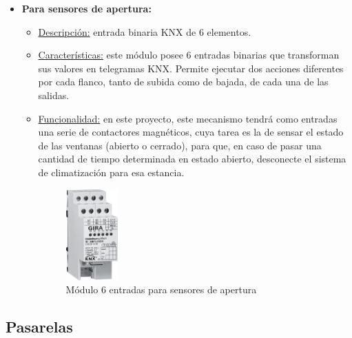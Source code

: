 \begin{itemize}
\item \textbf{Para sensores de apertura:} 
	\begin{itemize}
	\item\underline{Descripción:} entrada binaria KNX de 6 elementos.
	\item \underline{Características:} este módulo posee 6 entradas binarias que transforman sus valores en telegramas KNX. Permite ejecutar dos acciones diferentes por cada flanco, tanto de subida como de bajada, de cada una de las salidas.
	\item \underline{Funcionalidad:} en este proyecto, este mecanismo tendrá como entradas una serie de contactores magnéticos, cuya tarea es la de sensar el estado de las ventanas (abierto o cerrado), para que, en caso de pasar una cantidad de tiempo determinada en estado abierto, desconecte el sistema de climatización para esa estancia.
	\begin{figure}[h]
	\centering
	\includegraphics[width=0.2\textwidth]{figures/entradas_apertura.jpg}   
	\caption{Módulo 6 entradas para sensores de apertura}
	\label{fig:entradas_apertura}
	\end{figure}
	\end{itemize} 
\end{itemize} 

\subsection{Pasarelas}

